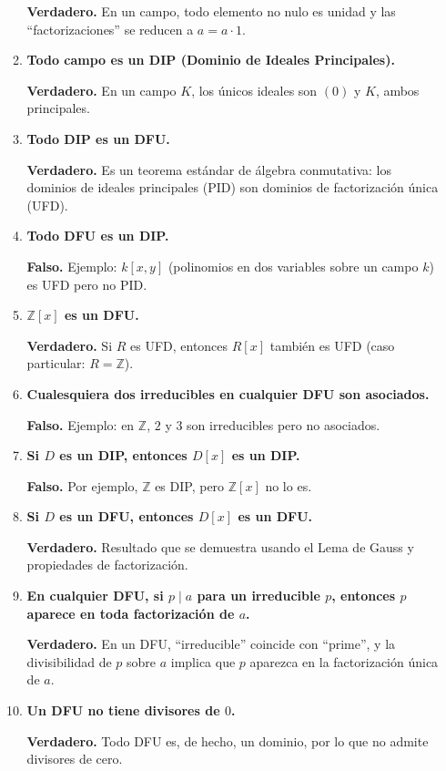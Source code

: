 \documentclass[12pt]{article}
\theoremstyle{definition}
\theoremstyle{remark}
\begin{document}
\begin{enumerate}[label=\textbf{\arabic*.}]
\begin{enumerate}[label=(\alph*)]
\textbf{Verdadero.} En un campo, todo elemento no nulo es unidad y las “factorizaciones” se reducen a $a = a \cdot 1$.

\item \textbf{Todo campo es un DIP (Dominio de Ideales Principales).}  

\textbf{Verdadero.} En un campo $K$, los únicos ideales son $(0)$ y $K$, ambos principales.

\item \textbf{Todo DIP es un DFU.}  

\textbf{Verdadero.} Es un teorema estándar de álgebra conmutativa: los dominios de ideales principales (PID) son dominios de factorización única (UFD).

\item \textbf{Todo DFU es un DIP.}  

\textbf{Falso.} Ejemplo: $k[x,y]$ (polinomios en dos variables sobre un campo $k$) es UFD pero no PID.

\item \textbf{$\mathbb{Z}[x]$ es un DFU.}  

\textbf{Verdadero.} Si $R$ es UFD, entonces $R[x]$ también es UFD (caso particular: $R=\mathbb{Z}$).

\item \textbf{Cualesquiera dos irreducibles en cualquier DFU son asociados.}  

\textbf{Falso.} Ejemplo: en $\mathbb{Z}$, $2$ y $3$ son irreducibles pero no asociados.

\item \textbf{Si $D$ es un DIP, entonces $D[x]$ es un DIP.}  

\textbf{Falso.} Por ejemplo, $\mathbb{Z}$ es DIP, pero $\mathbb{Z}[x]$ no lo es.

\item \textbf{Si $D$ es un DFU, entonces $D[x]$ es un DFU.}  

\textbf{Verdadero.} Resultado que se demuestra usando el Lema de Gauss y propiedades de factorización.

\item \textbf{En cualquier DFU, si $p \mid a$ para un irreducible $p$, entonces $p$ aparece en toda factorización de $a$.}  

\textbf{Verdadero.} En un DFU, “irreducible” coincide con “prime”, y la divisibilidad de $p$ sobre $a$ implica que $p$ aparezca en la factorización única de $a$.

\item \textbf{Un DFU no tiene divisores de $0$.}

\textbf{Verdadero.} Todo DFU es, de hecho, un dominio, por lo que no admite divisores de cero.
\end{enumerate}

\end{enumerate}
\end{document}
